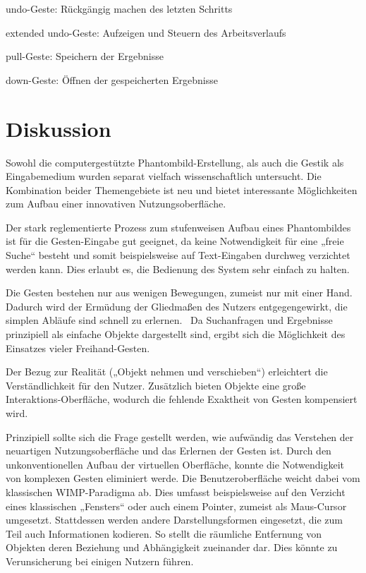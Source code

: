 \documentclass{sigchi-ext}
\begin{document}
undo-Geste: Rückgängig machen des letzten Schritts

extended undo-Geste: Aufzeigen und Steuern des Arbeitsverlaufs 

pull-Geste: Speichern der Ergebnisse

down-Geste: Öffnen der gespeicherten Ergebnisse

\section{Diskussion}
Sowohl die computergestützte Phantombild-Erstellung, als auch die
Gestik als Eingabemedium wurden separat vielfach wissenschaftlich
untersucht. Die Kombination beider Themengebiete ist neu und bietet
interessante Möglichkeiten zum Aufbau einer innovativen
Nutzungsoberfläche. 

Der stark reglementierte Prozess zum stufenweisen Aufbau eines
Phantombildes ist für die Gesten-Eingabe gut geeignet, da keine
Notwendigkeit für eine „freie Suche“ besteht und somit beispielsweise auf
Text-Eingaben durchweg verzichtet werden kann. Dies erlaubt es, die Bedienung des
System sehr einfach zu halten.

Die Gesten bestehen nur aus wenigen Bewegungen, zumeist nur mit einer
Hand. Dadurch wird der Ermüdung der Gliedmaßen des Nutzers
entgegengewirkt, die simplen Abläufe sind schnell zu
erlernen.~\cite{vrs:book}
Da Suchanfragen und Ergebnisse prinzipiell
als einfache Objekte dargestellt sind, ergibt sich die Möglichkeit des
Einsatzes vieler Freihand-Gesten.~\cite{3dinteraction:book}

Der Bezug zur Realität („Objekt nehmen und verschieben“) erleichtert die
Verständlichkeit für den Nutzer. Zusätzlich bieten Objekte eine große
Interaktions-Oberfläche, wodurch die fehlende Exaktheit von Gesten
kompensiert wird.~\cite{vrs:book}

Prinzipiell sollte sich die Frage gestellt werden, wie aufwändig das Verstehen
der neuartigen Nutzungsoberfläche und das Erlernen der Gesten ist. 
Durch den unkonventionellen Aufbau der virtuellen Oberfläche, konnte die Notwendigkeit von komplexen Gesten eliminiert werde. Die Benutzeroberfläche weicht dabei vom klassischen WIMP-Paradigma ab. Dies umfasst beispielsweise auf den Verzicht eines klassischen „Fensters“ oder auch einem Pointer, zumeist als Maus-Cursor umgesetzt. Stattdessen werden andere Darstellungsformen eingesetzt, die zum Teil auch Informationen kodieren. So stellt die räumliche Entfernung von Objekten deren Beziehung und Abhängigkeit zueinander dar. Dies könnte zu Verunsicherung bei einigen Nutzern führen.
\end{document}
